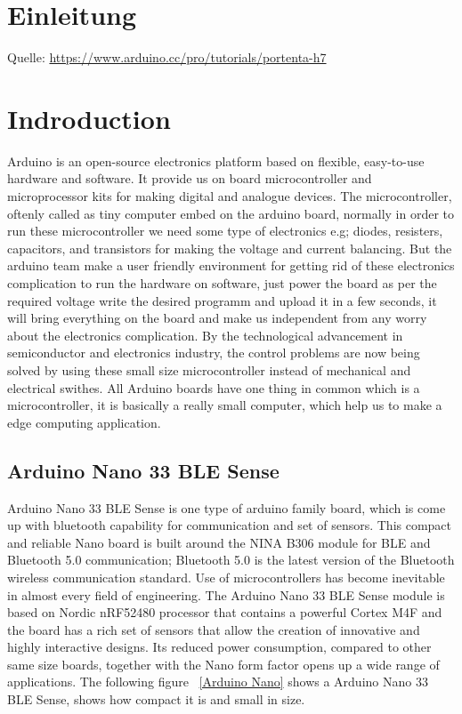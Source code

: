 %
%
%


\chapter{Einleitung}


{\tiny Quelle: \url{https://www.arduino.cc/pro/tutorials/portenta-h7}}


\chapter{Indroduction}


Arduino is an open-source electronics platform based on flexible, easy-to-use hardware and software. It provide us on board microcontroller and microprocessor kits for making digital and analogue devices. The microcontroller, oftenly called as tiny computer embed on the arduino board, normally in order to run these microcontroller we need some type of electronics e.g; diodes, resisters, capacitors, and transistors for making the voltage and current balancing. But the arduino team make a user friendly environment for getting rid of these electronics complication to run the hardware on software, just power the board as per the required voltage write the desired programm and upload it in a few seconds, it will bring everything on the board and  make us independent from any worry about the electronics complication. By the technological advancement in semiconductor and electronics  industry, the  control problems are now being solved by using these small size microcontroller instead of mechanical and electrical swithes. All Arduino boards have one thing in common which is a microcontroller, it is basically a really small computer, which help us to make a edge computing application.\cite{Arduino:2021b}

\section{Arduino Nano 33 BLE Sense}


Arduino Nano 33 BLE Sense is one type of arduino family board, which is come up with bluetooth capability for communication and set of sensors. This compact and reliable Nano board is built around the NINA B306 module for BLE and Bluetooth 5.0 communication; Bluetooth 5.0 is the latest version of the Bluetooth wireless communication standard. Use of microcontrollers has become inevitable in almost every field of engineering.  The Arduino Nano 33 BLE Sense module is based on Nordic nRF52480 processor that contains a powerful Cortex M4F and the board has a rich set of sensors that allow the creation of innovative and highly interactive designs. Its reduced power consumption, compared to other same size boards, together with the Nano form factor opens up a wide range of applications. The following figure ~\ref{Arduino Nano} shows a Arduino Nano 33 BLE Sense, shows how compact it is and small in size.

